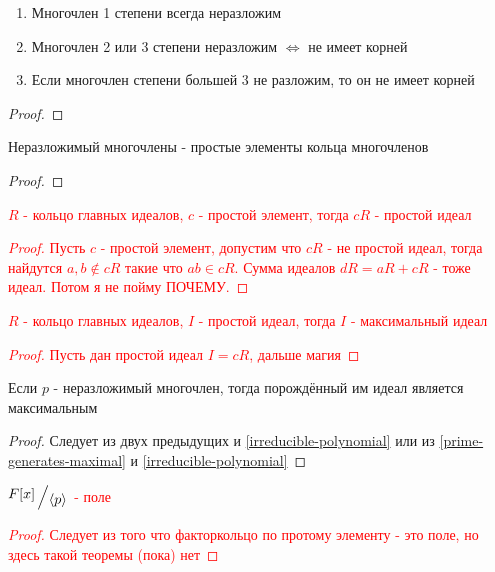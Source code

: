 \documentclass[../main/document.tex]{subfiles}
\begin{document}
\begin{cnsq}
\begin{enumerate}
\item Многочлен 1 степени всегда неразложим
\item Многочлен 2 или 3 степени неразложим $\Leftrightarrow$ не имеет корней
\item Если многочлен степени большей 3 не разложим, то он не имеет корней
\end{enumerate}
\begin{proof}

\end{proof}
\end{cnsq}
\begin{cnsq}\label{irreducible-polynomial}
Неразложимый многочлены - простые элементы кольца многочленов
\begin{proof}

\end{proof}
\end{cnsq}
\textcolor{red}{
\begin{thm}\label{prime-generates-prime}
$R$ - кольцо главных идеалов, $c$ - простой элемент, тогда $cR$ - простой идеал
\begin{proof}
Пусть $c$ - простой элемент, допустим что $cR$ - не простой идеал, тогда найдутся $a,b\not\in cR$ такие что $ab\in cR$. Сумма идеалов $dR=aR+cR$ - тоже идеал. Потом я не пойму ПОЧЕМУ.
\end{proof}
\end{thm}
\begin{thm}
$R$ - кольцо главных идеалов, $I$ - простой идеал, тогда $I$ - максимальный идеал
\begin{proof}
Пусть дан простой идеал $I=cR$, дальше магия
\end{proof}
\end{thm}}
\begin{cnsq}
Если $p$ - неразложимый многочлен, тогда порождённый им идеал является максимальным
\begin{proof}
Следует из двух предыдущих и \ref{irreducible-polynomial} или из \ref{prime-generates-maximal} и \ref{irreducible-polynomial}
\end{proof}
\end{cnsq}
\textcolor{red}{
\begin{cnsq}
$\bigslant{F[x]}{\langle p\rangle}$ - поле
\begin{proof}
Следует из того что факторкольцо по протому элементу - это поле, но здесь такой теоремы (пока) нет
\end{proof}
\end{cnsq}}
\end{document}
